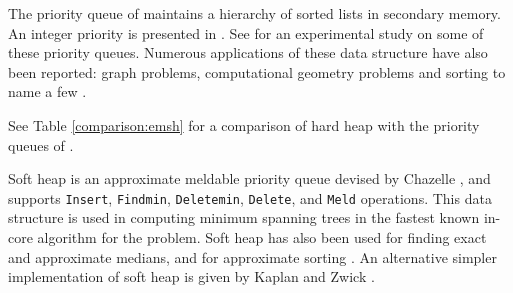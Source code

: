The priority queue of \cite{BK98} maintains a hierarchy of sorted lists in secondary memory.
An integer priority is presented in \cite{MZ03}.
See \cite{BCF+00} for an experimental study on some of these priority queues.
Numerous applications of these data structure have also been reported:
graph problems, computational geometry problems and sorting to name a few
\cite{Arge03,FJKT99,KS96}.

See Table \ref{comparison:emsh} for a comparison of hard heap with the
        priority queues of \cite{Arge03,FJKT99,KS96}.

Soft heap is an approximate meldable priority queue devised
        by Chazelle \cite{Ch00a}, and supports
        {\tt Insert}, {\tt Findmin}, {\tt Deletemin}, {\tt Delete}, and
        {\tt Meld} operations. 
This data structure is used in computing minimum spanning
        trees \cite{Ch00b} in the fastest known in-core algorithm for the problem.
Soft heap has also been used for finding exact and approximate
    medians, and for approximate sorting \cite{Ch00a}.
An alternative simpler implementation of soft heap 
is given by Kaplan and Zwick \cite{KaZw09}.

